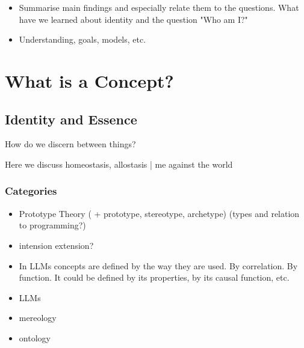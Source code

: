 




\begin{itemize}
    \item Summarise main findings and especially relate them to the questions. What have we learned about identity and the question "Who am I?"
    \item Understanding, goals, models, etc. 
\end{itemize}











\section{What is a Concept?}




\subsection{Identity and Essence}
How do we discern between things?

Here we discuss homeostasis, allostasis | me against the world
\subsubsection{Categories}
\begin{itemize}
    \item Prototype Theory ( + prototype, stereotype, archetype) (types and relation to programming?)
    \item intension extension?
    \item In LLMs concepts are defined by the way they are used. By correlation. By function. It could be defined by its properties, by its causal function, etc. 
    \item LLMs
    \item mereology
    \item ontology
\end{itemize}

